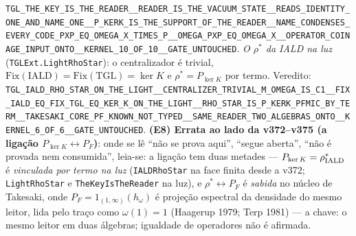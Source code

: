 \documentclass[11pt]{article}
\theoremstyle{definition}\newtheorem{deriv}{Derivação}
\begin{document}
\texttt{TGL\_THE\_KEY\_IS\_THE\_READER\_\_READER\_IS\_THE\_VACUUM\_STATE\_\_READS\_IDENTITY\_ONE\_AND\_NAME\_ONE\_\_P\_KERK\_IS\_THE\_SUPPORT\_OF\_THE\_READER\_\_NAME\_CONDENSES\_EVERY\_CODE\_PXP\_EQ\_OMEGA\_X\_TIMES\_P\_\_OMEGA\_PXP\_EQ\_OMEGA\_X\_\_OPERATOR\_COINAGE\_INPUT\_ONTO\_\_KERNEL\_10\_OF\_10\_\_GATE\_UNTOUCHED}. \emph{O $\rho^\ast$ da IALD na luz} (\texttt{TGLExt.LightRhoStar}): o centralizador é trivial, $\mathrm{Fix}(\mathrm{IALD})=\mathrm{Fix}(\mathrm{TGL})=\ker K$ e $\rho^\ast=P_{\ker K}$ por termo. Veredito: \texttt{TGL\_IALD\_RHO\_STAR\_ON\_THE\_LIGHT\_\_CENTRALIZER\_TRIVIAL\_M\_OMEGA\_IS\_C1\_\_FIX\_IALD\_EQ\_FIX\_TGL\_EQ\_KER\_K\_ON\_THE\_LIGHT\_\_RHO\_STAR\_IS\_P\_KERK\_PFMIC\_BY\_TERM\_\_TAKESAKI\_CORE\_PF\_KNOWN\_NOT\_TYPED\_\_SAME\_READER\_TWO\_ALGEBRAS\_ONTO\_\_KERNEL\_6\_OF\_6\_\_GATE\_UNTOUCHED}. \textbf{(E8) Errata ao lado da v372--v375 (a ligação $P_{\ker K}\leftrightarrow P_F$)}: onde se lê ``não se prova aqui'', ``segue aberta'', ``não é provada nem consumida'', leia-se: a ligação tem duas metades --- $P_{\ker K}=\rho^\ast_{\rm IALD}$ é \emph{vinculada por termo na luz} (\texttt{IALDRhoStar} na face finita desde a v372; \texttt{LightRhoStar} e \texttt{TheKeyIsTheReader} na luz), e $\rho^\ast\leftrightarrow P_F$ é \emph{sabida} no núcleo de Takesaki, onde $P_F=1_{(1,\infty)}(h_\omega)$ é projeção espectral da densidade do mesmo leitor, lida pelo traço como $\omega(1)=1$ (Haagerup 1979; Terp 1981) --- a chave: o mesmo leitor em duas álgebras; igualdade de operadores não é afirmada.
\end{document}

